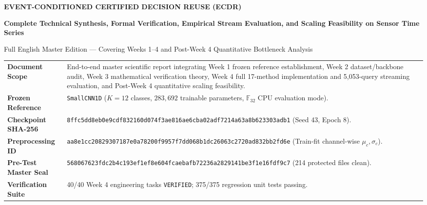 \documentclass[11pt,a4paper]{article}
\newcommand{\F}{\mathbb{F}}
\newcommand{\code}[1]{{\small\ttfamily\nolinkurl{#1}}}
\theoremstyle{remark}
\begin{document}
\hypersetup{pageanchor=false}
\begin{titlepage}
\vspace*{0.6cm}
{\Large\bfseries\color{teal} EVENT-CONDITIONED CERTIFIED DECISION REUSE (ECDR)\par}
\vspace{0.4cm}
{\huge\bfseries\color{ink} Complete Technical Synthesis, Formal Verification, Empirical Stream Evaluation, and Scaling Feasibility on Sensor Time Series\par}
\vspace{0.5cm}
{\large\color{ink} Full English Master Edition --- Covering Weeks 1--4 and Post-Week 4 Quantitative Bottleneck Analysis\par}
\vspace{0.7cm}

\begin{tabularx}{\linewidth}{@{}P{3.6cm}Y@{}}
\toprule
\textbf{Document Scope} & End-to-end master scientific report integrating Week 1 frozen reference establishment, Week 2 dataset/backbone audit, Week 3 mathematical verification theory, Week 4 full 17-method implementation and 5,053-query streaming evaluation, and Post-Week 4 quantitative scaling feasibility.\\
\textbf{Frozen Reference} & \code{SmallCNN1D} ($K=12$ classes, $283,692$ trainable parameters, $\F_{32}$ CPU evaluation mode).\\
\textbf{Checkpoint SHA-256} & \code{8ffc5dd8eb0e9cdf832160d074f3ae816ae6cba02adf7214a63a8b623303adb1} (Seed 43, Epoch 8).\\
\textbf{Preprocessing ID} & \code{aa8e1cc20829307187e0a78200f9957f7dd068b1dc26063c2720ad832bb2fd6e} (Train-fit channel-wise $\mu_c, \sigma_c$).\\
\textbf{Pre-Test Master Seal} & \code{568067623fdc2b4c193ef1ef8e604fcaebafb72236a2829141be3f1e16fdf9c7} (214 protected files clean).\\
\textbf{Verification Suite} & 40/40 Week 4 engineering tasks \code{VERIFIED}; 375/375 regression unit tests passing.\\
\bottomrule
\end{tabularx}


\end{titlepage}
\end{document}
